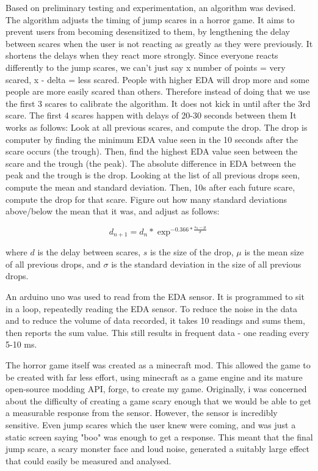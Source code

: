 \documentclass[12pt,a4paper]{article}\usepackage[]{graphicx}\usepackage[]{color}
\begin{document}
Based on preliminary testing and experimentation, an algorithm was devised.
The algorithm adjusts the timing of jump scares in a horror game.
It aims to prevent users from becoming desensitized to them, by lengthening the delay between scares when the user is not reacting as greatly as they were previously. It shortens the delays when they react more strongly.
Since everyone reacts differently to the jump scares, we can't just say x number of points = very scared, x - delta = less scared.
People with higher EDA will drop more and some people are more easily scared than others.
Therefore instead of doing that we use the first 3 scares to calibrate the algorithm.
It does not kick in until after the 3rd scare.
The first 4 scares happen with delays of 20-30 seconds between them
It works as follows:
Look at all previous scares, and compute the drop. The drop is computer by finding the minimum EDA value seen in the 10 seconds after the scare occurs (the trough).
Then, find the highest EDA value seen between the scare and the trough (the peak). The absolute difference in EDA between the peak and the trough is the drop.
Looking at the list of all previous drops seen, compute the mean and standard deviation. Then, 10s after each future scare, compute the drop for that scare. Figure out how many standard deviations above/below the mean that it was, and adjust as follows:

\begin{equation}
d_{n+1} = d_n * \exp^{-0.366 * \frac{s_n - \mu}{\sigma}}
\end{equation}

where $d$ is the delay between scares, $s$ is the size of the drop, $\mu$ is the mean size of all previous drops, and $\sigma$ is the standard deviation in the size of all previous drops. 

An arduino uno was used to read from the EDA sensor.
It is programmed to sit in a loop, repeatedly reading the EDA sensor.
To reduce the noise in the data and to reduce the volume of data recorded, it takes 10 readings and sums them, then reports the sum value. This still results in frequent data - one reading every 5-10 ms.

The horror game itself was created as a minecraft mod.
This allowed the game to be created with far less effort, using minecraft as a game engine and its mature open-source modding API, forge, to create my game.
Originally, i was concerned about the difficulty of creating a game scary enough that we would be able to get a measurable response from the sensor.
However, the sensor is incredibly sensitive.
Even jump scares which the user knew were coming, and was just a static screen saying "boo" was enough to get a response.
This meant that the final jump scare, a scary monster face and loud noise, generated a suitably large effect that could easily be measured and analysed.
\end{document}
